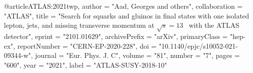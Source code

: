 @article{ATLAS:2021twp,
    author = "Aad, Georges and others",
    collaboration = "ATLAS",
    title = "{Search for squarks and gluinos in final states with one isolated lepton, jets, and missing transverse momentum at $\sqrt{s}=13$~ with the ATLAS detector}",
    eprint = "2101.01629",
    archivePrefix = "arXiv",
    primaryClass = "hep-ex",
    reportNumber = "CERN-EP-2020-228",
    doi = "10.1140/epjc/s10052-021-09344-w",
    journal = "Eur. Phys. J. C",
    volume = "81",
    number = "7",
    pages = "600",
    year = "2021",
    label = "ATLAS-SUSY-2018-10"
}

